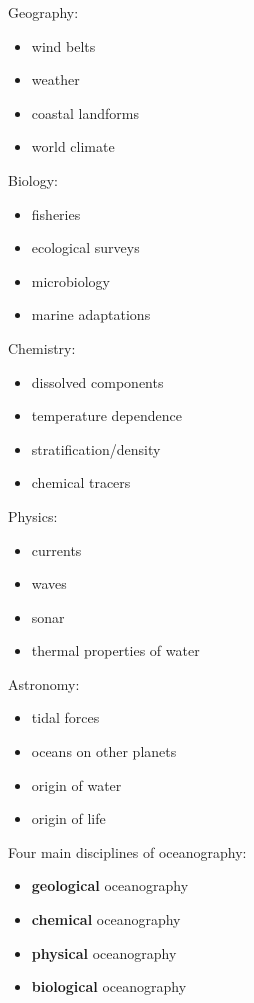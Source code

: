 Geography:
\begin{itemize}
	\item wind belts
	\item weather
	\item coastal landforms
	\item world climate
\end{itemize}

Biology:
\begin{itemize}
	\item fisheries
	\item ecological surveys
	\item microbiology
	\item marine adaptations
\end{itemize}

Chemistry:
\begin{itemize}
	\item dissolved components
	\item temperature dependence
	\item stratification/density
	\item chemical tracers
\end{itemize}

Physics:
\begin{itemize}
	\item currents
	\item waves
	\item sonar
	\item thermal properties of water
\end{itemize}

Astronomy:
\begin{itemize}
	\item tidal forces
	\item oceans on other planets
	\item origin of water
	\item origin of life
\end{itemize}

Four main disciplines of oceanography:

\begin{itemize}
	\item \textbf{geological} oceanography
	\item \textbf{chemical} oceanography
	\item \textbf{physical} oceanography
	\item \textbf{biological} oceanography
\end{itemize}

